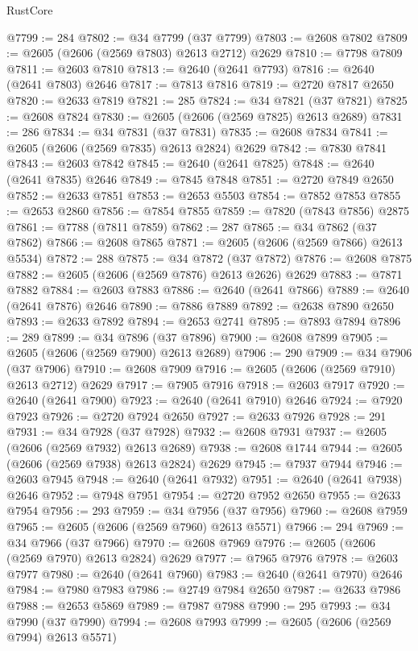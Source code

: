 \begin{lexlean}{RustCore}
\begin{coremodule}
@7799 := 284
@7802 := @34 @7799 (@37 @7799)
@7803 := @2608 @7802
@7809 := @2605 (@2606 (@2569 @7803) @2613 @2712) @2629
@7810 := @7798 @7809
@7811 := @2603 @7810
@7813 := @2640 (@2641 @7793)
@7816 := @2640 (@2641 @7803) @2646
@7817 := @7813 @7816
@7819 := @2720 @7817 @2650
@7820 := @2633 @7819
@7821 := 285
@7824 := @34 @7821 (@37 @7821)
@7825 := @2608 @7824
@7830 := @2605 (@2606 (@2569 @7825) @2613 @2689)
@7831 := 286
@7834 := @34 @7831 (@37 @7831)
@7835 := @2608 @7834
@7841 := @2605 (@2606 (@2569 @7835) @2613 @2824) @2629
@7842 := @7830 @7841
@7843 := @2603 @7842
@7845 := @2640 (@2641 @7825)
@7848 := @2640 (@2641 @7835) @2646
@7849 := @7845 @7848
@7851 := @2720 @7849 @2650
@7852 := @2633 @7851
@7853 := @2653 @5503
@7854 := @7852 @7853
@7855 := @2653 @2860
@7856 := @7854 @7855
@7859 := @7820 (@7843 @7856) @2875
@7861 := @7788 (@7811 @7859)
@7862 := 287
@7865 := @34 @7862 (@37 @7862)
@7866 := @2608 @7865
@7871 := @2605 (@2606 (@2569 @7866) @2613 @5534)
@7872 := 288
@7875 := @34 @7872 (@37 @7872)
@7876 := @2608 @7875
@7882 := @2605 (@2606 (@2569 @7876) @2613 @2626) @2629
@7883 := @7871 @7882
@7884 := @2603 @7883
@7886 := @2640 (@2641 @7866)
@7889 := @2640 (@2641 @7876) @2646
@7890 := @7886 @7889
@7892 := @2638 @7890 @2650
@7893 := @2633 @7892
@7894 := @2653 @2741
@7895 := @7893 @7894
@7896 := 289
@7899 := @34 @7896 (@37 @7896)
@7900 := @2608 @7899
@7905 := @2605 (@2606 (@2569 @7900) @2613 @2689)
@7906 := 290
@7909 := @34 @7906 (@37 @7906)
@7910 := @2608 @7909
@7916 := @2605 (@2606 (@2569 @7910) @2613 @2712) @2629
@7917 := @7905 @7916
@7918 := @2603 @7917
@7920 := @2640 (@2641 @7900)
@7923 := @2640 (@2641 @7910) @2646
@7924 := @7920 @7923
@7926 := @2720 @7924 @2650
@7927 := @2633 @7926
@7928 := 291
@7931 := @34 @7928 (@37 @7928)
@7932 := @2608 @7931
@7937 := @2605 (@2606 (@2569 @7932) @2613 @2689)
@7938 := @2608 @1744
@7944 := @2605 (@2606 (@2569 @7938) @2613 @2824) @2629
@7945 := @7937 @7944
@7946 := @2603 @7945
@7948 := @2640 (@2641 @7932)
@7951 := @2640 (@2641 @7938) @2646
@7952 := @7948 @7951
@7954 := @2720 @7952 @2650
@7955 := @2633 @7954
@7956 := 293
@7959 := @34 @7956 (@37 @7956)
@7960 := @2608 @7959
@7965 := @2605 (@2606 (@2569 @7960) @2613 @5571)
@7966 := 294
@7969 := @34 @7966 (@37 @7966)
@7970 := @2608 @7969
@7976 := @2605 (@2606 (@2569 @7970) @2613 @2824) @2629
@7977 := @7965 @7976
@7978 := @2603 @7977
@7980 := @2640 (@2641 @7960)
@7983 := @2640 (@2641 @7970) @2646
@7984 := @7980 @7983
@7986 := @2749 @7984 @2650
@7987 := @2633 @7986
@7988 := @2653 @5869
@7989 := @7987 @7988
@7990 := 295
@7993 := @34 @7990 (@37 @7990)
@7994 := @2608 @7993
@7999 := @2605 (@2606 (@2569 @7994) @2613 @5571)

\end{coremodule}
\end{lexlean}
